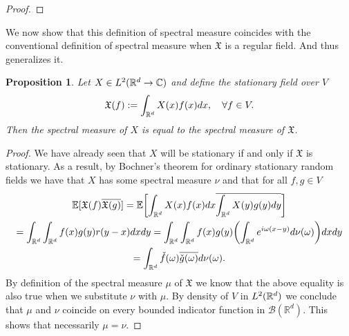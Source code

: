 \documentclass[12pt]{article}
\newtheorem{proposition}{Proposition}
\begin{document}
\begin{CJK*}{UTF8}{gbsn}
\begin{proof}
	\end{proof}


	We now show that this definition of spectral measure coincides with the conventional definition of spectral measure when $\mathfrak{X}$ is a regular field. And thus generalizes it.
	\begin{proposition}
		Let  $X \in L^2({\mathbb R}^d\to\mathbb{C})$ and define the stationary field over $V$
		\begin{equation*}
			\mathfrak{X}(f):=\int_{{\mathbb R}^d}X(x)f(x)dx, \quad\forall f\in V.
		\end{equation*}
		Then the spectral measure of  $X$ is equal to the spectral measure of  $\mathfrak{X}$.
	\end{proposition}
	\begin{proof}
		We have already seen that $X$ will be stationary  if and only if  $\mathfrak{X}$ is stationary. As a result, by Bochner's theorem for ordinary stationary random fields we have that  $X$ has some
		spectral measure  $\nu $ and that for all $f,g \in V$
		\begin{multline*}
			\mathbb{E}[\mathfrak{X} (f)\overline{\mathfrak{X} (g)}]=\mathbb{E}\qty[\int_{{\mathbb R}^d}X(x)f(x) dx\overline{\int_{{\mathbb R}^d}X(y)g(y) dy}]\\=\int_{{\mathbb R}^d}\int_{{\mathbb R}^d}f(x)g(y)r(y-x) dx dy=
			\int_{{\mathbb R}^d}\int_{{\mathbb R}^d} f(x)g(y)\qty(\int_{{\mathbb R}^d}e^{i\omega(x-y)}d\nu(\omega))dxdy \\=\int_{{\mathbb R}^d}\check{f}(\omega)\overline{\check{g}(\omega)}d \nu(\omega) .
		\end{multline*}
		By definition of the spectral measure $\mu $ of $\mathfrak{X}$ we know that the above equality is also true when we substitute $\nu$ with $\mu$. By density of $V$ in  $L^2({\mathbb R}^d)$ we conclude that $\mu$ and $\nu$ coincide on every bounded indicator function in $\mathcal{B}(\mathbb{R}^d)$. This shows that necessarily $\mu =\nu$.
	\end{proof}




\end{CJK*}
\end{document}
